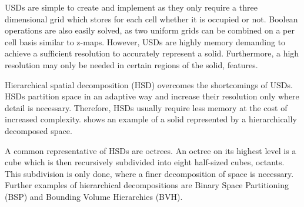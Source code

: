 \begin{description}
	USDs are simple to create and implement as they only require a three dimensional grid which stores for each cell whether it is occupied or not.
	Boolean operations are also easily solved, as two uniform grids can be combined on a per cell basis similar to z-maps.
	However, USDs are highly memory demanding to achieve a sufficient resolution to accurately represent a solid.
	Furthermore, a high resolution may only be needed in certain regions of the solid, \ie features.

	Hierarchical spatial decomposition (HSD) overcomes the shortcomings of USDs.
	HSDs partition space in an adaptive way and increase their resolution only where detail is necessary.
	Therefore, HSDs usually require less memory at the cost of increased complexity.
	 shows an example of a solid represented by a hierarchically decomposed space.

	A common representative of HSDs are octrees.
	An octree on its highest level is a cube which is then recursively subdivided into eight half-sized cubes, \aka octants.
	This subdivision is only done, where a finer decomposition of space is necessary.
	Further examples of hierarchical decompositions are Binary Space Partitioning (BSP) and Bounding Volume Hierarchies (BVH).


\end{description}
